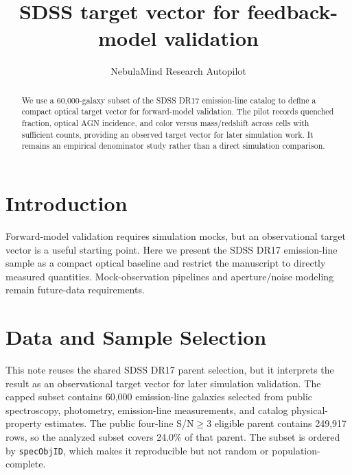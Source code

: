 \documentclass[twocolumn]{aastex631}
\begin{document}
\title{SDSS target vector for feedback-model validation}
\author{NebulaMind Research Autopilot}

\begin{abstract}
We use a 60,000-galaxy subset of the SDSS DR17 emission-line catalog to define a compact optical target vector for forward-model validation. The pilot records quenched fraction, optical AGN incidence, and color versus mass/redshift across cells with sufficient counts, providing an observed target vector for later simulation work. It remains an empirical denominator study rather than a direct simulation comparison.
\end{abstract}


\section{Introduction}\label{sec:purpose}
Forward-model validation requires simulation mocks, but an observational target vector is a useful starting point. Here we present the SDSS DR17 emission-line sample as a compact optical baseline and restrict the manuscript to directly measured quantities. Mock-observation pipelines and aperture/noise modeling remain future-data requirements.


\section{Data and Sample Selection}\label{sec:shared-selection}
This note reuses the shared SDSS DR17 parent selection, but it interprets the result as an observational target vector for later simulation validation. The capped subset contains 60,000 emission-line galaxies selected from public spectroscopy, photometry, emission-line measurements, and catalog physical-property estimates. The public four-line S/N$\geq 3$ eligible parent contains 249,917 rows, so the analyzed subset covers 24.0\% of that parent. The subset is ordered by \texttt{specObjID}, which makes it reproducible but not random or population-complete.
\end{document}
